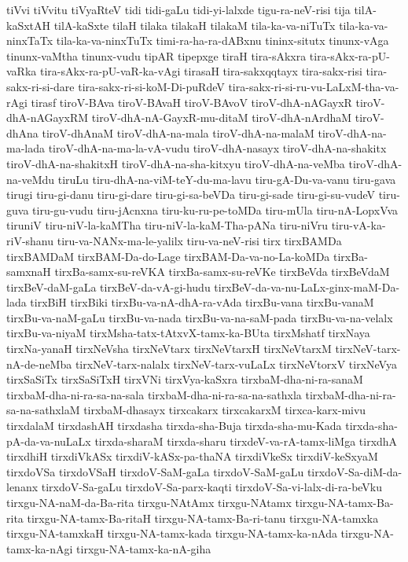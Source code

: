 {tiVvi
tiVvitu
tiVyaRteV
tidi
tidi-gaLu
tidi-yi-lalxde
tigu-ra-neV-risi
tija
tilA-kaSxtAH
tilA-kaSxte
tilaH
tilaka
tilakaH
tilakaM
tila-ka-va-niTuTx
tila-ka-va-ninxTaTx
tila-ka-va-ninxTuTx
timi-ra-ha-ra-dABxnu
tininx-situtx
tinunx-vAga
tinunx-vaMtha
tinunx-vudu
tipAR
tipepxge
tiraH
tira-sAkxra
tira-sAkx-ra-pU-vaRka
tira-sAkx-ra-pU-vaR-ka-vAgi
tirasaH
tira-sakxqqtayx
tira-sakx-risi
tira-sakx-ri-si-dare
tira-sakx-ri-si-koM-Di-puRdeV
tira-sakx-ri-si-ru-vu-LaLxM-tha-va-rAgi
tirasf
tiroV-BAva
tiroV-BAvaH
tiroV-BAvoV
tiroV-dhA-nAGayxR
tiroV-dhA-nAGayxRM
tiroV-dhA-nA-GayxR-mu-ditaM
tiroV-dhA-nArdhaM
tiroV-dhAna
tiroV-dhAnaM
tiroV-dhA-na-mala
tiroV-dhA-na-malaM
tiroV-dhA-na-ma-lada
tiroV-dhA-na-ma-la-vA-vudu
tiroV-dhA-nasayx
tiroV-dhA-na-shakitx
tiroV-dhA-na-shakitxH
tiroV-dhA-na-sha-kitxyu
tiroV-dhA-na-veMba
tiroV-dhA-na-veMdu
tiruLu
tiru-dhA-na-viM-teY-du-ma-lavu
tiru-gA-Du-va-vanu
tiru-gava
tirugi
tiru-gi-danu
tiru-gi-dare
tiru-gi-sa-beVDa
tiru-gi-sade
tiru-gi-su-vudeV
tiru-guva
tiru-gu-vudu
tiru-jAcnxna
tiru-ku-ru-pe-toMDa
tiru-mUla
tiru-nA-LopxVva
tiruniV
tiru-niV-la-kaMTha
tiru-niV-la-kaM-Tha-pANa
tiru-niVru
tiru-vA-ka-riV-shanu
tiru-va-NANx-ma-le-yalilx
tiru-va-neV-risi
tirx
tirxBAMDa
tirxBAMDaM
tirxBAM-Da-do-Lage
tirxBAM-Da-va-no-La-koMDa
tirxBa-samxnaH
tirxBa-samx-su-reVKA
tirxBa-samx-su-reVKe
tirxBeVda
tirxBeVdaM
tirxBeV-daM-gaLa
tirxBeV-da-vA-gi-hudu
tirxBeV-da-va-nu-LaLx-ginx-maM-Da-lada
tirxBiH
tirxBiki
tirxBu-va-nA-dhA-ra-vAda
tirxBu-vana
tirxBu-vanaM
tirxBu-va-naM-gaLu
tirxBu-va-nada
tirxBu-va-na-saM-pada
tirxBu-va-na-velalx
tirxBu-va-niyaM
tirxMsha-tatx-tAtxvX-tamx-ka-BUta
tirxMshatf
tirxNaya
tirxNa-yanaH
tirxNeVsha
tirxNeVtarx
tirxNeVtarxH
tirxNeVtarxM
tirxNeV-tarx-nA-de-neMba
tirxNeV-tarx-nalalx
tirxNeV-tarx-vuLaLx
tirxNeVtorxV
tirxNeVya
tirxSaSiTx
tirxSaSiTxH
tirxVNi
tirxVya-kaSxra
tirxbaM-dha-ni-ra-sanaM
tirxbaM-dha-ni-ra-sa-na-sala
tirxbaM-dha-ni-ra-sa-na-sathxla
tirxbaM-dha-ni-ra-sa-na-sathxlaM
tirxbaM-dhasayx
tirxcakarx
tirxcakarxM
tirxca-karx-mivu
tirxdalaM
tirxdashAH
tirxdasha
tirxda-sha-Buja
tirxda-sha-mu-Kada
tirxda-sha-pA-da-va-nuLaLx
tirxda-sharaM
tirxda-sharu
tirxdeV-va-rA-tamx-liMga
tirxdhA
tirxdhiH
tirxdiVkASx
tirxdiV-kASx-pa-thaNA
tirxdiVkeSx
tirxdiV-keSxyaM
tirxdoVSa
tirxdoVSaH
tirxdoV-SaM-gaLa
tirxdoV-SaM-gaLu
tirxdoV-Sa-diM-da-lenanx
tirxdoV-Sa-gaLu
tirxdoV-Sa-parx-kaqti
tirxdoV-Sa-vi-lalx-di-ra-beVku
tirxgu-NA-naM-da-Ba-rita
tirxgu-NAtAmx
tirxgu-NAtamx
tirxgu-NA-tamx-Ba-rita
tirxgu-NA-tamx-Ba-ritaH
tirxgu-NA-tamx-Ba-ri-tanu
tirxgu-NA-tamxka
tirxgu-NA-tamxkaH
tirxgu-NA-tamx-kada
tirxgu-NA-tamx-ka-nAda
tirxgu-NA-tamx-ka-nAgi
tirxgu-NA-tamx-ka-nA-giha
}
